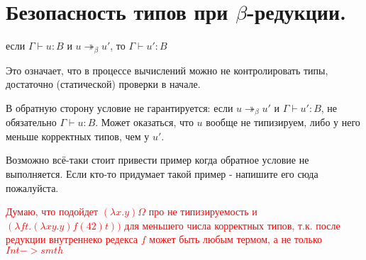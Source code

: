 \section{Безопасность типов при \texorpdfstring{$\beta$}{}-редукции.}

\begin{definition}
если $\Gamma \vdash u : B$ и $u\twoheadrightarrow_\beta u'$, то $\Gamma \vdash u' : B$
\end{definition}
Это означает, что в процессе вычислений можно не
контролировать типы, достаточно (статической) проверки
в начале.
\begin{important}
В обратную сторону условие не гарантируется: если $u\twoheadrightarrow_\beta u'$ и $\Gamma \vdash u' : B$, не обязательно $\Gamma \vdash u : B$. Может оказаться,
что $u$ вообще не типизируем, либо у него меньше
корректных типов, чем у $u'$.
\end{important}

\begin{example} 
Возможно всё-таки стоит привести пример когда обратное условие не выполняется.
Если кто-то придумает такой пример - напишите его сюда пожалуйста.
\end{example}

\textcolor{red}{Думаю, что подойдет $(\lambda x. y)\Omega$ про не типизируемость и $(\lambda f t. (\lambda x y. y) f(42) t ))$ для меньшего числа корректных типов, т.к. после редукции внутреннеко редекса $f$ может быть любым термом, а не только $Int -> smth$}